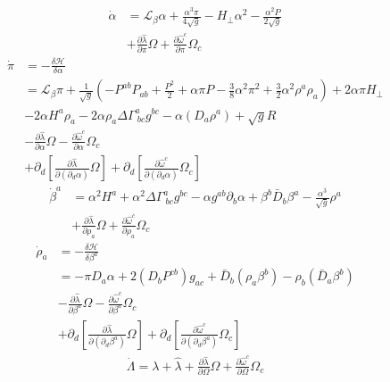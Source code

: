 \documentclass{article}
\begin{document}
\begin{align*}
{\dot \alpha} & = \mathcal{L}_{\beta}\alpha + \frac{\alpha^3 \pi}{4 \sqrt{g}} - H_{\perp}\alpha^2 - \frac{\alpha^2 P}{2\sqrt{g}}\\
& + \frac{\partial {\hat \lambda}}{\partial \pi}\Omega + \frac{\partial {\hat \omega}^{c}}{\partial \pi}\Omega_{c}
\end{align*}
\begin{align*}
{\dot \pi} & = - \frac{\delta \mathcal{H}}{\delta \alpha} \\
& = \mathcal{L}_{\beta} \pi + \frac{1}{\sqrt{g}}(-P^{ab}P_{ab} + \frac{P^2}{2} + \alpha \pi P - \frac{3}{8}\alpha^2 \pi^2 + \frac{3}{2}\alpha^2 \rho^{a}\rho_{a}) + 2\alpha \pi H_{\perp} \\
& - 2 \alpha H^{a}\rho_{a} - 2\alpha \rho_{a} \Delta \Gamma^{a}_{~bc}g^{bc} - \alpha (D_{a}\rho^{a}) + \sqrt{g}R\\
& - \frac{\partial {\hat \lambda}}{\partial \alpha}\Omega - \frac{\partial {\hat \omega}^{c}}{\partial \alpha}\Omega_{c}\\
& + \partial_{d}[\frac{\partial {\hat \lambda}}{\partial(\partial_{d}\alpha)}\Omega] + \partial_{d}[\frac{\partial {\hat \omega^{c}}}{\partial(\partial_{d}\alpha)}\Omega_{c}]
\end{align*}
\begin{align*}
{\dot \beta}^{a} & = \alpha^2 H^{a} + \alpha^2\Delta \Gamma^{a}_{~bc}g^{bc} - \alpha g^{ab}\partial_{b}\alpha + \beta^{b}{\bar D}_{b}\beta^{a} - \frac{\alpha^3}{\sqrt{g}} \rho^{a}\\
& + \frac{\partial {\hat \lambda}}{\partial \rho_{a}}\Omega + \frac{\partial {\hat \omega}^{c}}{\partial \rho_{a}}\Omega_{c}
\end{align*}
\begin{align*}
{\dot \rho}_{a} & = -\frac{\delta \mathcal{H}}{\delta \beta^{a}}\\
& = -\pi D_{a} \alpha + 2(D_{b}P^{cb})g_{ac} + {\bar D}_{b}(\rho_{a}\beta^{b}) - \rho_{b}({\bar D}_{a}\beta^{b})\\
& - \frac{\partial {\hat \lambda}}{\partial \beta^{a}}\Omega - \frac{\partial {\hat \omega}^{c}}{\partial \beta^{a}}\Omega_{c}\\
& + \partial_{d}[\frac{\partial {\hat \lambda}}{\partial(\partial_{d}\beta^{a})}\Omega] + \partial_{d}[\frac{\partial {\hat \omega^{c}}}{\partial(\partial_{d}\beta^{a})}\Omega_{c}]
\end{align*}
\begin{align*}
{\dot \Lambda} = \lambda + {\hat \lambda} + \frac{\partial {\hat \lambda}}{\partial \Omega}\Omega + \frac{\partial {\hat \omega}^{c}}{\partial \Omega}\Omega_{c}
\end{align*}
\end{document}
